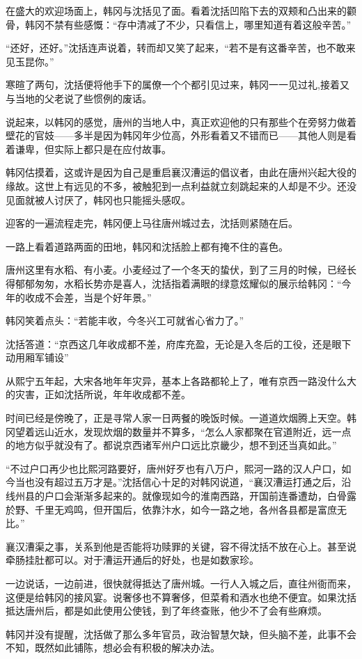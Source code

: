 在盛大的欢迎场面上，韩冈与沈括见了面。看着沈括凹陷下去的双颊和凸出来的颧骨，韩冈不禁有些感慨：“存中清减了不少，只看信上，哪里知道有着这般辛苦。”

“还好，还好。”沈括连声说着，转而却又笑了起来，“若不是有这番辛苦，也不敢来见玉昆你。”

寒暄了两句，沈括便将他手下的属僚一个个都引见过来，韩冈一一见过礼,接着又与当地的父老说了些惯例的废话。

说起来，以韩冈的感觉，唐州的当地人中，真正欢迎他的只有那些个在旁努力做着壁花的官妓——多半是因为韩冈年少位高，外形看着又不错而已——其他人则是看着谦卑，但实际上都只是在应付故事。

韩冈估摸着，这或许是因为自己是重启襄汉漕运的倡议者，由此在唐州兴起大役的缘故。这世上有远见的不多，被触犯到一点利益就立刻跳起来的人却是不少。还没见面就被人讨厌了，韩冈也只能摇头感叹。

迎客的一遍流程走完，韩冈便上马往唐州城过去，沈括则紧随在后。

一路上看着道路两面的田地，韩冈和沈括脸上都有掩不住的喜色。

唐州这里有水稻、有小麦。小麦经过了一个冬天的蛰伏，到了三月的时候，已经长得郁郁匆匆，水稻长势亦是喜人，沈括指着满眼的绿意炫耀似的展示给韩冈：“今年的收成不会差，当是个好年景。”

韩冈笑着点头：“若能丰收，今冬兴工可就省心省力了。”

沈括答道：“京西这几年收成都不差，府库充盈，无论是入冬后的工役，还是眼下动用厢军铺设”

从熙宁五年起，大宋各地年年灾异，基本上各路都轮上了，唯有京西一路没什么大的灾害，正如沈括所说，年年收成都不差。

时间已经是傍晚了，正是寻常人家一日两餐的晚饭时候。一道道炊烟腾上天空。韩冈望着远山近水，发现炊烟的数量并不算多，“怎么人家都聚在官道附近，远一点的地方似乎就没有了。都说京西诸军州户口远比京畿少，想不到还当真如此。”

“不过户口再少也比熙河路要好，唐州好歹也有八万户，熙河一路的汉人户口，如今当也没有超过五万才是。”沈括信心十足的对韩冈说道，“襄汉漕运打通之后，沿线州县的户口会渐渐多起来的。就像现如今的淮南西路，开国前连番遭劫，白骨露於野、千里无鸡鸣，但开国后，依靠汴水，如今一路之地，各州各县都是富庶无比。”

襄汉漕渠之事，关系到他是否能将功赎罪的关键，容不得沈括不放在心上。甚至说牵肠挂肚都可以。对于漕运开通后的好处，也是如数家珍。

一边说话，一边前进，很快就得抵达了唐州城。一行人入城之后，直往州衙而来，这便是给韩冈的接风宴。说奢侈也不算奢侈，但菜肴和酒水也绝不便宜。如果沈括抵达唐州后，都是如此使用公使钱，到了年终查账，他少不了会有些麻烦。

韩冈并没有提醒，沈括做了那么多年官员，政治智慧欠缺，但头脑不差，此事不会不知，既然如此铺陈，想必会有积极的解决办法。

